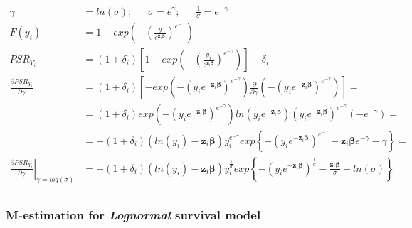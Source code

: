 \documentclass[]{article}
\begin{document}
  $$
  \begin{aligned}
    \gamma &= ln(\sigma);~~~~~~~ \sigma = e^{\gamma};~~~~~~~ \frac{1}{\sigma} = e^{-\gamma}\\
    F(y_i)  &= 1-exp\left(-\left(\frac{y}{e^{\pmb{z}_i\pmb{\beta}}}\right)^{e^{-\gamma}}\right)\\
    PSR_{Y_i} &=  (1+\delta_i) \left[  1-exp\left(-\left(\frac{y_i}{e^{\pmb{z}_i\pmb{\beta}}}\right)^{e^{-\gamma}}\right)    \right]  -  \delta_i\\
    \frac{\partial PSR_{Y_i}}{\partial \gamma} &= (1+\delta_i)   \left[   -exp\left(-\left(y_i e^{-\pmb{z}_i\pmb{\beta}}\right)^{e^{-\gamma}}\right)   \frac{\partial}{\partial \gamma}\left(    -\left(   y_i e^{-\pmb{z}_i\pmb{\beta}}  \right) ^{e^{-\gamma}} \right)   \right] =\\
    & = (1+\delta_i)      exp\left(-\left(y_i e^{-\pmb{z}_i\pmb{\beta}}\right)^{e^{-\gamma}}\right)   ln\left( y_i e^{-\pmb{z}_i\pmb{\beta}}  \right)        \left(   y_i e^{-\pmb{z}_i\pmb{\beta}}  \right) ^{e^{-\gamma}} \left( -e^{-\gamma} \right)   = \\
    & = - (1+\delta_i)   \left(  ln(y_i) -\pmb{z}_i\pmb{\beta}  \right)     y_i ^{e^{-\gamma}} exp \left\{    -\left(y_i e^{-\pmb{z}_i\pmb{\beta}}\right)^{e^{-\gamma}}      -\pmb{z}_i\pmb{\beta}e^{-\gamma}      -\gamma \right\}   = \\
    \left. \frac{\partial PSR_{Y_i}}{\partial \gamma} \right|_{\gamma = log(\sigma)} &= - (1+\delta_i)   \left(  ln(y_i) -\pmb{z}_i\pmb{\beta}  \right)     y_i ^{\frac{1}{\sigma}} exp \left\{    -\left(y_i e^{-\pmb{z}_i\pmb{\beta}}\right)^{\frac{1}{\sigma}}      -\frac{\pmb{z}_i\pmb{\beta}}{\sigma}     -ln(\sigma) \right\}\\
  \end{aligned}
  $$

\subsubsection{M-estimation for \emph{Lognormal} survival model}
\label{MEst:lognormal}
\end{document}
